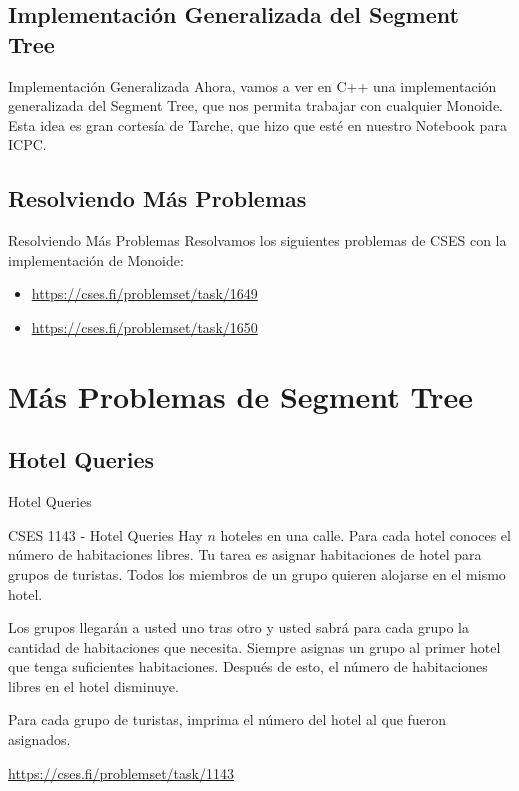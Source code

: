 \documentclass{beamer}
\begin{document}
\subsection{Implementación Generalizada del Segment Tree}

\begin{frame}{Implementación Generalizada}
Ahora, vamos a ver en C++ una implementación generalizada del Segment Tree, que nos permita trabajar con cualquier Monoide. Esta idea es gran cortesía de Tarche, que hizo que esté en nuestro Notebook para ICPC.
\end{frame}

\subsection{Resolviendo Más Problemas}
\begin{frame}{Resolviendo Más Problemas}
Resolvamos los siguientes problemas de CSES con la implementación de Monoide:
\begin{itemize}
    \item \url{https://cses.fi/problemset/task/1649}
    \item \url{https://cses.fi/problemset/task/1650}
\end{itemize}
\end{frame}

\section{Más Problemas de Segment Tree}

\subsection{Hotel Queries}
\begin{frame}{Hotel Queries}
\begin{block}{CSES 1143 - Hotel Queries}
Hay $n$ hoteles en una calle. Para cada hotel conoces el número de habitaciones libres. Tu tarea es asignar habitaciones de hotel para grupos de turistas. Todos los miembros de un grupo quieren alojarse en el mismo hotel.

Los grupos llegarán a usted uno tras otro y usted sabrá para cada grupo la cantidad de habitaciones que necesita. Siempre asignas un grupo al primer hotel que tenga suficientes habitaciones. Después de esto, el número de habitaciones libres en el hotel disminuye.

Para cada grupo de turistas, imprima el número del hotel al que fueron asignados.
\end{block}

\url{https://cses.fi/problemset/task/1143}
\end{frame}
\end{document}
